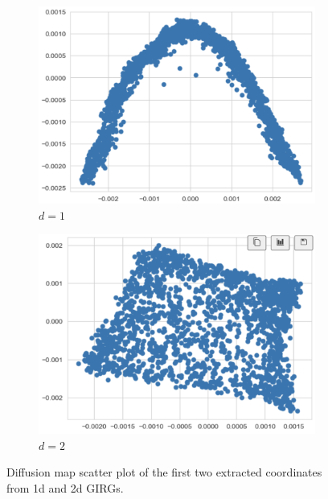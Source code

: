 \begin{figure}
    \centering

    \begin{subfigure}{0.49\textwidth}
      \centering
      \includegraphics[width=\linewidth]{figures/diffmap_1d_plot.png}
      \caption{$d=1$}
      \label{fig:sub1}
    \end{subfigure}
    \hfill
    \begin{subfigure}{0.49\textwidth}
      \centering
      \includegraphics[width=\linewidth]{figures/diffmap_2d_plot.png}
      \caption{$d=2$}
      \label{fig:cube_diffmap_plots_d2}
    \end{subfigure}

  
    \caption{Diffusion map scatter plot of the first two extracted coordinates from 1d and 2d GIRGs.}
    \label{fig:cube_diffmap_plots_d1and2}
\end{figure}


